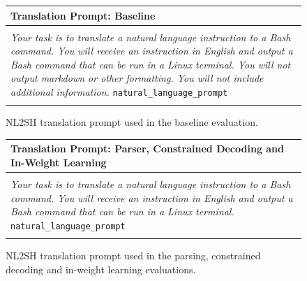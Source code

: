\documentclass[11pt]{article}
\begin{document}
\begin{figure}[ht!]
  \centering
  \small
  \begin{tabular}{l}
    \hline
    \textbf{Translation Prompt: Baseline} \\
    \hline
    \\
    \begin{minipage}{0.97\textwidth}
      \textit{Your task is to translate a natural language instruction to a Bash command. You will receive an instruction in English and output a Bash command that can be run in a Linux terminal. You will not output markdown or other formatting. You will not include additional information. }\texttt{natural\_language\_prompt}
    \end{minipage}
    \\\\
    \hline
  \end{tabular}
  \caption{NL2SH translation prompt used in the baseline evaluation.}
  \label{fig:prompt-baseline}
\end{figure}

\begin{figure}[ht!]
  \centering
  \small
  \begin{tabular}{l}
    \hline
    \textbf{Translation Prompt: Parser, Constrained Decoding and In-Weight Learning} \\
    \hline
    \\
    \begin{minipage}{0.97\textwidth}
      \textit{Your task is to translate a natural language instruction to a Bash command. You will receive an instruction in English and output a Bash command that can be run in a Linux terminal. }\texttt{natural\_language\_prompt}
    \end{minipage}
    \\\\
    \hline
  \end{tabular}
  \caption{NL2SH translation prompt used in the parsing, constrained decoding and in-weight learning evaluations.}
  \label{fig:prompt-other}
\end{figure}
\end{document}
